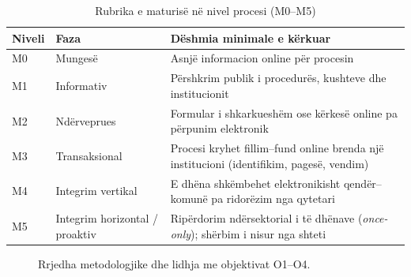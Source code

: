 \documentclass[conference]{IEEEtran}
\begin{document}
\begin{table}[!t]
\caption{Rubrika e maturisë në nivel procesi (M0--M5)}
\label{tab:rubrika}
\centering
\footnotesize
\renewcommand{\arraystretch}{1.15}
\begin{tabular}{L{0.10\columnwidth} L{0.24\columnwidth} L{0.54\columnwidth}}
\toprule
\textbf{Niveli} & \textbf{Faza} & \textbf{Dëshmia minimale e kërkuar} \\
\midrule
M0 & Mungesë & Asnjë informacion online për procesin \\
M1 & Informativ & Përshkrim publik i procedurës, kushteve dhe institucionit \\
M2 & Ndërveprues & Formular i shkarkueshëm ose kërkesë online pa
përpunim elektronik \\
M3 & Transaksional & Procesi kryhet fillim--fund online brenda një
institucioni (identifikim, pagesë, vendim) \\
M4 & Integrim vertikal & E dhëna shkëmbehet elektronikisht qendër--komunë pa
ridorëzim nga qytetari \\
M5 & Integrim horizontal / proaktiv & Ripërdorim ndërsektorial i të dhënave
(\textit{once-only}); shërbim i nisur nga shteti \\
\bottomrule
\end{tabular}
\end{table}

\begin{figure}[!t]
\centering
{}
\caption{Rrjedha metodologjike dhe lidhja me objektivat O1--O4.}
\label{fig:metodologjia}
\end{figure}
\end{document}

